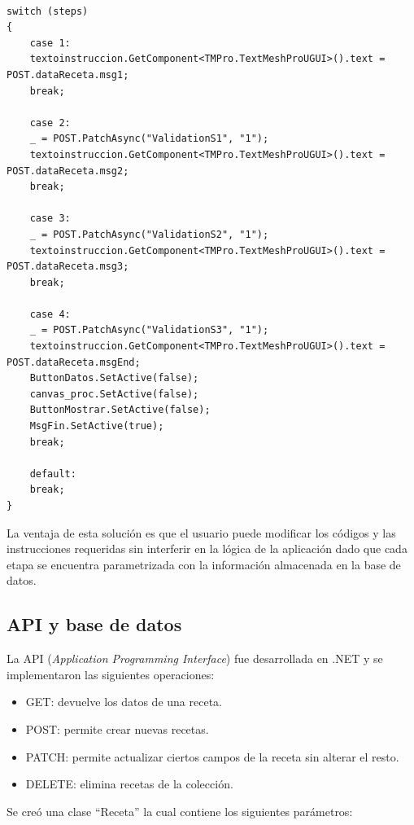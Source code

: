 \begin{lstlisting}[label=cod:vControl,caption=Maquina de estados]  % Start your code-block

switch (steps)
{
	case 1:
   	textoinstruccion.GetComponent<TMPro.TextMeshProUGUI>().text = POST.dataReceta.msg1;
    break;
	
	case 2:
    _ = POST.PatchAsync("ValidationS1", "1");
    textoinstruccion.GetComponent<TMPro.TextMeshProUGUI>().text = POST.dataReceta.msg2;
    break;

	case 3:
    _ = POST.PatchAsync("ValidationS2", "1");
    textoinstruccion.GetComponent<TMPro.TextMeshProUGUI>().text = POST.dataReceta.msg3;
    break;

    case 4:
    _ = POST.PatchAsync("ValidationS3", "1");
    textoinstruccion.GetComponent<TMPro.TextMeshProUGUI>().text = POST.dataReceta.msgEnd;
    ButtonDatos.SetActive(false);
    canvas_proc.SetActive(false);
    ButtonMostrar.SetActive(false);
    MsgFin.SetActive(true);
    break;

    default:
    break;
}
\end{lstlisting}

La ventaja de esta solución es que el usuario puede modificar los códigos y las instrucciones requeridas sin interferir en la lógica de la aplicación dado que cada etapa se encuentra parametrizada con la información almacenada en la base de datos.

\subsection{API y base de datos}
La API (\textit{Application Programming Interface}) fue desarrollada en .NET y se implementaron las siguientes operaciones:

\begin{itemize}
\item GET: devuelve los datos de una receta.
\item POST: permite crear nuevas recetas.
\item PATCH: permite actualizar ciertos campos de la receta sin alterar el resto.
\item DELETE: elimina recetas de la colección.
\end{itemize}

Se creó una clase ``Receta'' la cual contiene los siguientes parámetros:

